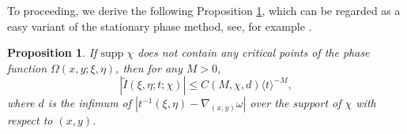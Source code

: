 \documentclass[12pt]{amsart}
\newtheorem{proposition}[theorem]{Proposition}
\newcommand\JP[1]{\langle#1\rangle}
\begin{document}
To proceeding, we derive the following Proposition \ref{prop:fast decay}, which can be regarded as a easy variant of the stationary phase method, see, for example \cite{SM93, W03}.
\begin{proposition}\label{prop:fast decay}
     If $\mathrm{supp}\;\chi$ does not contain any critical points of the phase function $\Omega\left(x,y;\xi,\eta\right)$, then for any $M>0$,
    \begin{equation*}
        \left|\widetilde{I}\left(\xi,\eta;t;\chi\right)\right|\leq C\left(M,\chi,d\right)\JP{t}^{-M},
    \end{equation*}
    where $d$ is the infimum of $\left|t^{-1}\left(\xi,\eta\right)-\nabla_{\left(x,y\right)}\omega\right|$ over the support of $\chi$ with respect to $\left(x,y\right)$.
\end{proposition}
\end{document}
